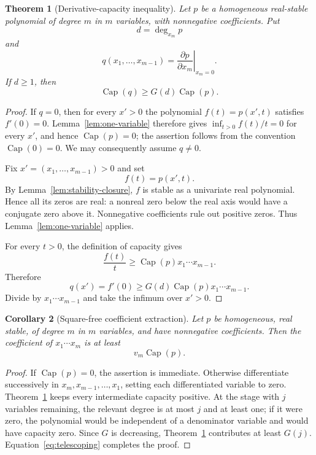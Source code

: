 \documentclass[11pt,a4paper]{article}
\numberwithin{equation}{section}
\newtheorem{theorem}{Theorem}[section]
\newtheorem{corollary}[theorem]{Corollary}
\theoremstyle{definition}
\newcommand{\pcap}{\operatorname{Cap}}
\newcommand{\1}{\mathbf{1}}
\begin{document}
\begin{theorem}[Derivative-capacity inequality]\label{thm:derivative-capacity}
Let $p$ be a homogeneous real-stable polynomial of degree $m$ in $m$ variables, with nonnegative coefficients.  Put
\[
 d=\deg_{x_m}p
\]
and
\[
 q(x_1,\dots,x_{m-1})
 =\left.\frac{\partial p}{\partial x_m}\right|_{x_m=0}.
\]
If $d\ge1$, then
\begin{equation}\label{eq:derivative-capacity}
 \pcap(q)\ge G(d)\pcap(p).
\end{equation}
\end{theorem}

\begin{proof}
If $q=0$, then for every $x'>0$ the polynomial $f(t)=p(x',t)$ satisfies
$f'(0)=0$.  Lemma~\ref{lem:one-variable} therefore gives
$\inf_{t>0}f(t)/t=0$ for every $x'$, and hence $\pcap(p)=0$; the assertion
follows from the convention $\pcap(0)=0$.  We may consequently assume
$q\ne0$.

Fix $x'=(x_1,\dots,x_{m-1})>0$ and set
\[
 f(t)=p(x',t).
\]
By Lemma~\ref{lem:stability-closure}, $f$ is stable as a univariate real polynomial.  Hence all its zeros are real: a nonreal zero below the real axis would have a conjugate zero above it.  Nonnegative coefficients rule out positive zeros.  Thus Lemma~\ref{lem:one-variable} applies.

For every $t>0$, the definition of capacity gives
\[
 \frac{f(t)}{t}\ge \pcap(p)x_1\cdots x_{m-1}.
\]
Therefore
\[
 q(x')=f'(0)
 \ge G(d)\pcap(p)x_1\cdots x_{m-1}.
\]
Divide by $x_1\cdots x_{m-1}$ and take the infimum over $x'>0$.
\end{proof}

\begin{corollary}[Square-free coefficient extraction]\label{cor:squarefree}
Let $p$ be homogeneous, real stable, of degree $m$ in $m$ variables, and have nonnegative coefficients.  Then the coefficient of $x_1\cdots x_m$ is at least
\[
 v_m\pcap(p).
\]
\end{corollary}

\begin{proof}
If $\pcap(p)=0$, the assertion is immediate.  Otherwise differentiate successively in $x_m,x_{m-1},\dots,x_1$, setting each differentiated variable to zero.  Theorem~\ref{thm:derivative-capacity} keeps every intermediate capacity positive.  At the stage with $j$ variables remaining, the relevant degree is at most $j$ and at least one; if it were zero, the polynomial would be independent of a denominator variable and would have capacity zero.  Since $G$ is decreasing, Theorem~\ref{thm:derivative-capacity} contributes at least $G(j)$.  Equation~\eqref{eq:telescoping} completes the proof.
\end{proof}
\end{document}
